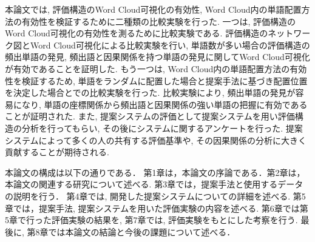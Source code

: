\documentclass[syuuron]{kuee}
\begin{document}
	本論文では, 評価構造のWord Cloud可視化の有効性, Word Cloud内の単語配置方法の有効性を検証するために二種類の比較実験を行った. 
	一つは, 評価構造のWord Cloud可視化の有効性を測るために比較実験である.  
	評価構造のネットワーク図とWord Cloud可視化による比較実験を行い, 
	単語数が多い場合の評価構造の頻出単語の発見, 頻出語と因果関係を持つ単語の発見に関してWord Cloud可視化が有効であることを証明した. 
	もう一つは, Word Cloud内の単語配置方法の有効性を検証するため, 
	単語をランダムに配置した場合と提案手法に基づき配置位置を決定した場合とでの比較実験を行った. 
	比較実験により, 頻出単語の発見が容易になり, 単語の座標関係から頻出語と因果関係の強い単語の把握に有効であることが証明された. 
	また, 提案システムの評価として提案システムを用い評価構造の分析を行ってもらい, その後にシステムに関するアンケートを行った. 
	提案システムによって多くの人の共有する評価基準や, その因果関係の分析に大きく貢献することが期待される. 

	本論文の構成は以下の通りである．
	第1章は，本論文の序論である．第2章は，本論文の関連する研究について述べる. 第3章では，提案手法と使用するデータの説明を行う．
	第4章では, 開発した提案システムについての詳細を述べる. 
	第5章では，提案手法, 提案システムを用いた評価実験の内容を述べる. 
	第6章では第5章で行った評価実験の結果を, 第7章では, 評価実験をもとにした考察を行う. 
	最後に, 第8章では本論文の結論と今後の課題について述べる．
\end{document}

